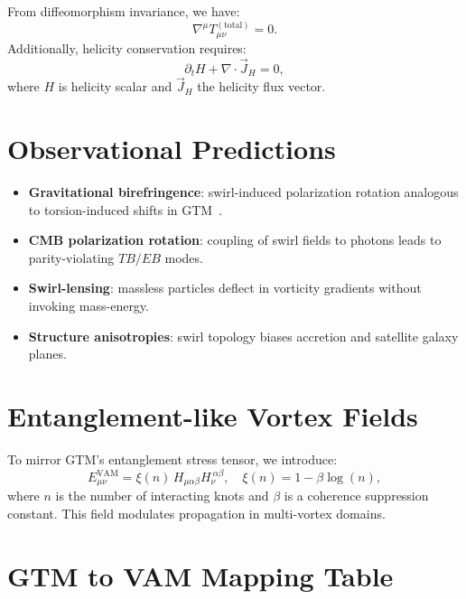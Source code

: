 \documentclass[12pt]{article}
\begin{document}
        From diffeomorphism invariance, we have:
        \[
            \nabla^\mu T^{(\text{total})}_{\mu\nu} = 0.
        \]
        Additionally, helicity conservation requires:
        \[
            \partial_t H + \nabla \cdot \vec{J}_H = 0,
        \]
        where \( H \) is helicity scalar and \( \vec{J}_H \) the helicity flux vector.

        \section{Observational Predictions}

        \begin{itemize}
            \item \textbf{Gravitational birefringence}: swirl-induced polarization rotation analogous to torsion-induced shifts in GTM~\cite{lucat2017torsion}.
            \item \textbf{CMB polarization rotation}: coupling of swirl fields to photons leads to parity-violating \( TB/EB \) modes.
            \item \textbf{Swirl-lensing}: massless particles deflect in vorticity gradients without invoking mass-energy.
            \item \textbf{Structure anisotropies}: swirl topology biases accretion and satellite galaxy planes.
        \end{itemize}

        \section{Entanglement-like Vortex Fields}

        To mirror GTM’s entanglement stress tensor, we introduce:
        \[
            E_{\mu\nu}^{\text{VAM}} = \xi(n) \, H_{\mu\alpha\beta} H_\nu^{\ \alpha\beta},
            \quad \xi(n) = 1 - \beta \log(n),
        \]
        where \( n \) is the number of interacting knots and \( \beta \) is a coherence suppression constant. This field modulates propagation in multi-vortex domains.

        \section{GTM to VAM Mapping Table}
\end{document}
